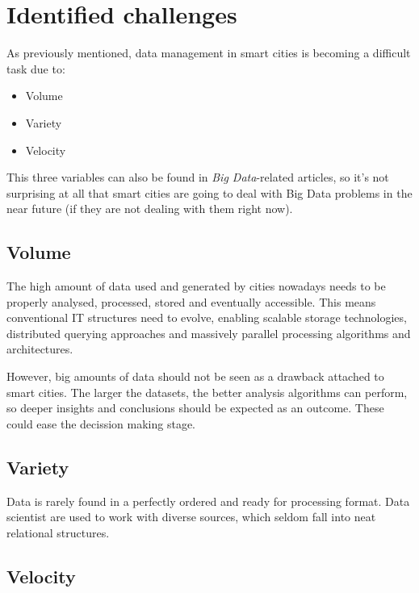\section{Identified challenges}

As previously mentioned, data management in smart cities is becoming a difficult task due to:
\begin{itemize}
	\item Volume
	\item Variety
	\item Velocity
\end{itemize}

This three variables can also be found in \textit{Big Data}-related articles, so it's not surprising at all that smart cities are going to deal with Big Data problems in the near future (if they are not dealing with them right now).

\subsection{Volume}

The high amount of data used and generated by cities nowadays needs to be properly analysed, processed, stored and eventually accessible. This means conventional IT structures need to evolve, enabling scalable storage technologies, distributed querying approaches and massively parallel processing algorithms and architectures.


However, big amounts of data should not be seen as a drawback attached to smart cities. The larger the datasets, the better analysis algorithms can perform, so deeper insights and conclusions should be expected as an outcome. These could ease the decission making stage.

\subsection{Variety}

Data is rarely found in a perfectly ordered and ready for processing format. Data scientist are used to work with diverse sources, which seldom fall into neat relational structures.


\subsection{Velocity}

